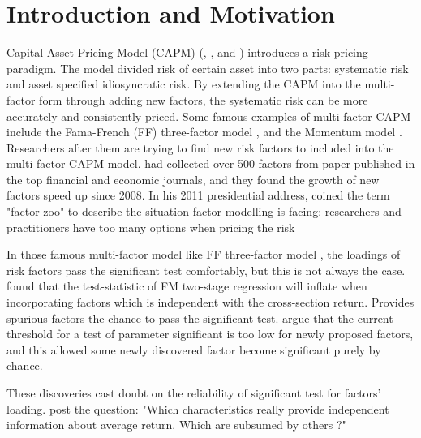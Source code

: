\documentclass[12pt]{article}
\begin{document}

\newpage	
\tableofcontents
\newpage
	\section{Introduction and Motivation}
Capital Asset Pricing Model (CAPM) (, , and ) introduces a risk pricing paradigm.
The model divided risk of certain asset into two parts: systematic risk and asset specified idiosyncratic risk.
By extending the CAPM into the multi-factor form through adding new factors, the systematic risk can be more accurately and consistently priced. 
Some famous examples of multi-factor CAPM include the Fama-French (FF) three-factor model \cite{Fama1992}, and the Momentum model \cite{Carhart1997}.
Researchers after them are trying to find new risk factors to included into the multi-factor CAPM model.
 had collected over 500 factors from paper published in the top financial and economic journals, and they found the growth of new factors speed up since 2008. 
In his 2011 presidential address, \citeauthor{Cochrane2011} coined the term "factor zoo" to describe the situation factor modelling is facing: researchers and practitioners have too many options when pricing the risk

In those famous multi-factor model like FF three-factor model \cite{Fama1992}, the loadings of risk factors pass the significant test comfortably, but this is not always the case. 
 found that the test-statistic of FM two-stage regression  \cite{Fama1973} will inflate when incorporating factors which is independent with the cross-section return.
Provides spurious factors the chance  to pass the significant test.
 argue that the current threshold for a test of parameter significant is too low for newly proposed factors, and this allowed some newly discovered factor become significant purely by chance. 



These discoveries cast doubt on the reliability of significant test for factors' loading.
 post the question: "Which characteristics really provide independent information about average return. Which are subsumed by others ?"
\end{document}
